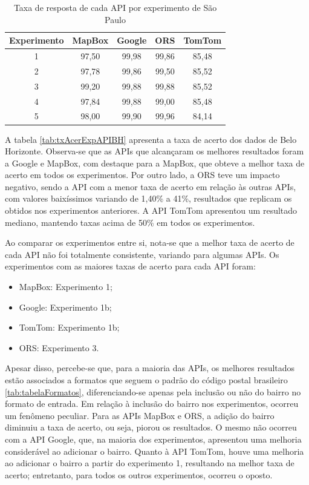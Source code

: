 \begin{table}[!ht]
    \centering
    \caption{Taxa de resposta de cada API por experimento de São Paulo}
    \label{tab:txRespExpAPISP}
    \begin{adjustbox}{width=0.7\textwidth}
    \begin{tabular}{|c|c|c|c|c|}
    \hline
    Experimento & MapBox & Google & ORS & TomTom\\
    \hline
    1 & 97,50 & 99,98 & 99,86 & 85,48\\
    \hline
    2 & 97,78 & 99,86 & 99,50 & 85,52\\
    \hline
    3 & 99,20 & 99,88 & 99,88 & 85,52\\
    \hline
    4 & 97,84 & 99,88 & 99,00 & 85,48\\
    \hline
    5 & 98,00 & 99,90 & 99,96 & 84,14\\
    \hline
    \end{tabular}
    \end{adjustbox}
\end{table}

A tabela \ref{tab:txAcerExpAPIBH} apresenta a taxa de acerto dos dados de Belo Horizonte. Observa-se que as APIs que alcançaram os melhores resultados foram a Google e MapBox, com destaque para a MapBox, que obteve a melhor taxa de acerto em todos os experimentos. Por outro lado, a ORS teve um impacto negativo, sendo a API com a menor taxa de acerto em relação às outras APIs, com valores baixíssimos variando de 1,40\% a 41\%, resultados que replicam os obtidos nos experimentos anteriores. A API TomTom apresentou um resultado mediano, mantendo taxas acima de 50\% em todos os experimentos.

Ao comparar os experimentos entre si, nota-se que a melhor taxa de acerto de cada API não foi totalmente consistente, variando para algumas APIs. Os experimentos com as maiores taxas de acerto para cada API foram:
\begin{itemize}
  \item MapBox: Experimento 1;
  \item Google: Experimento 1b;
  \item TomTom: Experimento 1b;
  \item ORS: Experimento 3.
\end{itemize} 

Apesar disso, percebe-se que, para a maioria das APIs, os melhores resultados estão associados a formatos que seguem o padrão do código postal brasileiro \ref{tab:tabelaFormatos}, diferenciando-se apenas pela inclusão ou não do bairro no formato de entrada. Em relação à inclusão do bairro nos experimentos, ocorreu um fenômeno peculiar. Para as APIs MapBox e ORS, a adição do bairro diminuiu a taxa de acerto, ou seja, piorou os resultados. O mesmo não ocorreu com a API Google, que, na maioria dos experimentos, apresentou uma melhoria considerável ao adicionar o bairro. Quanto à API TomTom, houve uma melhoria ao adicionar o bairro a partir do experimento 1, resultando na melhor taxa de acerto; entretanto, para todos os outros experimentos, ocorreu o oposto.

